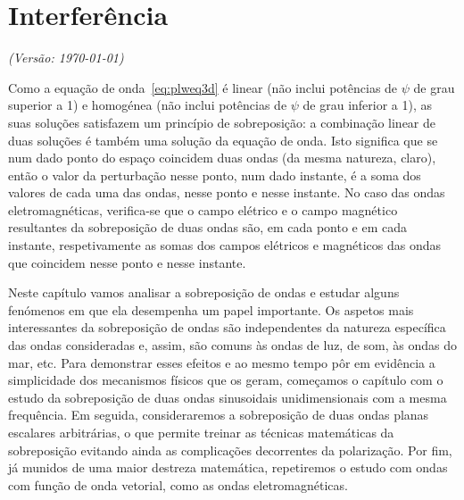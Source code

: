\chapter{Interferência}
\label{chpt:superp}
\textsl{{\sffamily(Versão: \today)}}

\noindent
Como a equação de onda~\eqref{eq:plweq3d} é linear (não inclui potências de
$\psi$ de grau superior a 1) e homogénea (não inclui potências de $\psi$ de grau
inferior a 1), as suas soluções satisfazem um princípio de sobreposição: a
combinação linear de duas soluções é também uma solução da equação de onda. Isto
significa que se num dado ponto do espaço coincidem duas ondas (da mesma
natureza, claro), então o valor da perturbação nesse ponto, num dado instante, é
a soma dos valores de cada uma das ondas, nesse ponto e nesse instante. No caso
das ondas eletromagnéticas, verifica\-\mbox{-se} que o campo elétrico e o campo
magnético resultantes da sobreposição de duas ondas são, em cada ponto e em cada
instante, respetivamente as somas dos campos elétricos e magnéticos das 
ondas que coincidem nesse ponto e nesse instante.

Neste capítulo vamos analisar a sobreposição de ondas e estudar alguns
fenómenos em que ela desempenha um papel importante. Os aspetos mais
interessantes da sobreposição de ondas são independentes da natureza específica
das ondas consideradas e, assim, são comuns às ondas de luz, de som, às ondas do
mar, etc.  Para demonstrar esses efeitos e ao mesmo tempo pôr em evidência a
simplicidade dos mecanismos físicos que os geram, começamos o capítulo com o
estudo da sobreposição de duas ondas sinusoidais unidimensionais com a mesma
frequência.  Em seguida, consideraremos a sobreposição de duas ondas planas
escalares arbitrárias, o que permite treinar as técnicas matemáticas da
sobreposição evitando ainda as complicações decorrentes da polarização.  Por
fim, já munidos de uma maior destreza matemática, repetiremos o estudo com ondas
com função de onda vetorial, como as ondas eletromagnéticas.

